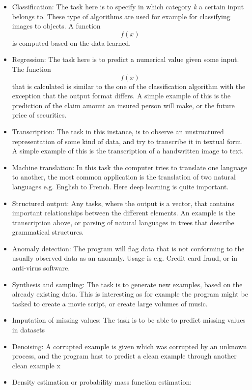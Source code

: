 \documentclass{article}
\begin{document}
\begin{itemize}
    \item Classification: The task here is to specify in which category \textit{k} a certain input belongs to. These type of algorithms are used for example for classifying images to objects. A function \[f(x)\] is computed based on the data learned.
    \item Regression: The task here is to predict a numerical value given some input. The function \[f(x)\] that is calculated is similar to the one of the classification algorithm with the exception that the output format differs. A simple example of this is the prediction of the claim amount an insured person will make, or the future price of securities.
    \item Transcription: The task in this instance, is to observe an unstructured representation of some kind of data, and try to transcribe it in textual form. A simple example of this is the transcription of a handwritten image to text.
    \item Machine translation: In this task the computer tries to translate one language to another, the most common application is the translation of two natural languages e.g. English to French. Here deep learning is quite important.
    \item Structured output: Any tasks, where the output is a vector, that contains important relationships between the different elements. An example is the transcription above, or parsing of natural languages in trees that describe grammatical structures.
    \item Anomaly detection: The program will flag data that is not conforming to the usually observed data as an anomaly. Usage is e.g. Credit card fraud, or in anti-virus software.
    \item Synthesis and sampling: The task is to generate new examples, based on the already existing data. This is interesting as for example the program might be tasked to create a movie script, or create large volumes of music.
    \item Imputation of missing values: The task is to be able to predict missing values in datasets
    \item Denoising: A corrupted example is given which was corrupted by an unknown process, and the program hast to predict a clean example through another clean example x
    \item Density estimation or probability mass function estimation: 
\end{itemize}
\end{document}
